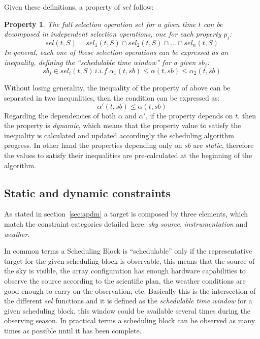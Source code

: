 Given these definitions, a property of $sel$ follow:

\newtheorem{sel-props}{Property}
\begin{sel-props}
The full selection operation $sel$ for a given time $t$ can be decomposed in independent selection operations, one for each property $p_i$:
$$sel(t,S) = sel_1(t, S) \cap sel_2(t, S) \cap ... \cap sel_n(t,S)$$
In general, each one of these selection operations can be expressed  as an inequality, defining the ``schedulable time window'' for a given $sb_j$:
$$sb_j \in sel_i(t, S)\,i.i.f\;\alpha_1(t, sb) \leq \alpha(t, sb) \leq \alpha_2(t, sb)$$
\end{sel-props}

Without losing generality, the inequality of the property of above can be separated in two inequalities, then the condition can be expressed as: 
$$\alpha'(t, sb) \leq \alpha (t, sb)$$
Regarding the dependencies of both $\alpha$ and $\alpha'$, if the property depends on $t$, then the property is \textit{dynamic}, which means that the property value to satisfy the inequality is calculated and updated accordingly the scheduling algorithm progress. In other hand the properties depending only on $sb$ are \textit{static}, therefore the values to satisfy their inequalities are pre-calculated at the beginning of the algorithm.\\

\subsection{Static and dynamic constraints}

As stated in section~\ref{sec:apdm} a target is composed by three elements, which match the constraint categories detailed here: \textit{sky source}, \textit{instrumentation} and \textit{weather}.

In common terms a Scheduling Block is ``schedulable'' only if the representative target for the given scheduling block is observable, this means that the source of the sky is visible, the array configuration has enough hardware capabilities to observe the source according to the scientific plan, the weather conditions are good enough to carry on the observation, etc. Basically this is the intersection of the different $sel$ functions and it is defined as the \textit{schedulable time window} for a given scheduling block, this window could be available several times during the observing season. In practical terms a scheduling block can be observed as many times as possible until it has been complete.

